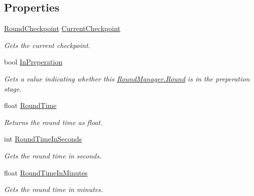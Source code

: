 \subsection*{Properties}
\begin{DoxyCompactItemize}
\item 
\hyperlink{class_round_manager_1_1_round_checkpoint}{Round\+Checkpoint} \hyperlink{class_round_manager_1_1_round_af5caa46388278646d34c7255ce52b0be}{Current\+Checkpoint}
\begin{DoxyCompactList}\small\item\em Gets the current checkpoint. \end{DoxyCompactList}\item 
bool \hyperlink{class_round_manager_1_1_round_a1b6e615e3cde6ad8b16de057f63deea9}{In\+Preperation}
\begin{DoxyCompactList}\small\item\em Gets a value indicating whether this \hyperlink{class_round_manager_1_1_round}{Round\+Manager.\+Round} is in the preperation stage. \end{DoxyCompactList}\item 
float \hyperlink{class_round_manager_1_1_round_ae62fa1d669d9e997810330a075c8f313}{Round\+Time}
\begin{DoxyCompactList}\small\item\em Returns the round time as float. \end{DoxyCompactList}\item 
int \hyperlink{class_round_manager_1_1_round_a58dc1defbee3968241a14102cd6804e7}{Round\+Time\+In\+Seconds}
\begin{DoxyCompactList}\small\item\em Gets the round time in seconds. \end{DoxyCompactList}\item 
float \hyperlink{class_round_manager_1_1_round_ad234c1b6503c0b204a63354860652fed}{Round\+Time\+In\+Minutes}
\begin{DoxyCompactList}\small\item\em Gets the round time in minutes. \end{DoxyCompactList}\item 

\end{DoxyCompactItemize}
